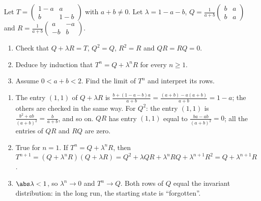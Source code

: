 \begin{exercise}
Let $T=\begin{pmatrix}1-a&a\\b&1-b\end{pmatrix}$ with $a+b\neq0$. Let $\lambda=1-a-b$, $Q=\frac1{a+b}\begin{pmatrix}b&a\\b&a\end{pmatrix}$ and $R=\frac1{a+b}\begin{pmatrix}a&-a\\-b&b\end{pmatrix}$.
\begin{enumerate}
\item Check that $Q+\lambda R=T$, $Q^2=Q$, $R^2=R$ and $QR=RQ=0$.
\item Deduce by induction that $T^n=Q+\lambda^nR$ for every $n\ge1$.
\item Assume $0<a+b<2$. Find the limit of $T^n$ and interpret its rows.
\end{enumerate}
\end{exercise}
\begin{solution}
\begin{enumerate}
\item The entry $(1,1)$ of $Q+\lambda R$ is $\frac{b+(1-a-b)a}{a+b}=\frac{(a+b)-a(a+b)}{a+b}=1-a$; the others are checked in the same way. For $Q^2$: the entry $(1,1)$ is $\frac{b^2+ab}{(a+b)^2}=\frac b{a+b}$, and so on. $QR$ has entry $(1,1)$ equal to $\frac{ba-ab}{(a+b)^2}=0$; all the entries of $QR$ and $RQ$ are zero.
\item True for $n=1$. If $T^n=Q+\lambda^nR$, then $T^{n+1}=(Q+\lambda^nR)(Q+\lambda R)=Q^2+\lambda QR+\lambda^nRQ+\lambda^{n+1}R^2=Q+\lambda^{n+1}R$.
\item $\abs\lambda<1$, so $\lambda^n\to0$ and $T^n\to Q$. Both rows of $Q$ equal the invariant distribution: in the long run, the starting state is ``forgotten''.
\end{enumerate}
\end{solution}

\mxnewpage
